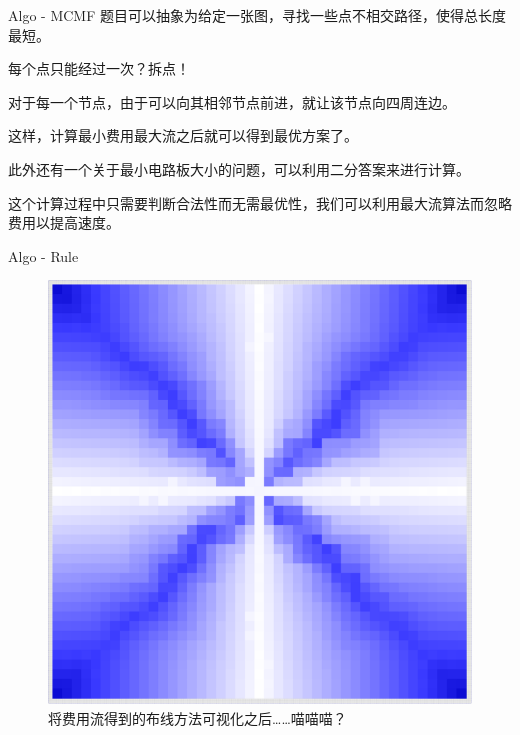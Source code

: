 \documentclass{beamer}
\begin{document}
\begin{frame}{Algo - MCMF}
题目可以抽象为给定一张图，寻找一些点不相交路径，使得总长度最短。

\pause
每个点只能经过一次？拆点！

\pause
对于每一个节点，由于可以向其相邻节点前进，就让该节点向四周连边。

这样，计算最小费用最大流之后就可以得到最优方案了。

\pause
此外还有一个关于最小电路板大小的问题，可以利用二分答案来进行计算。

这个计算过程中只需要判断合法性而无需最优性，我们可以利用最大流算法而忽略费用以提高速度。
\end{frame}

\begin{frame}{Algo - Rule}
\begin{figure}[htp]
\centering
\includegraphics[width=0.5\linewidth]{../project/testcase/label/43.png}
\caption{将费用流得到的布线方法可视化之后……喵喵喵？}
\end{figure}
\end{frame}
\end{document}

